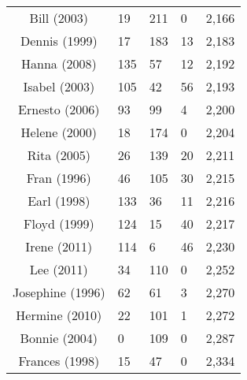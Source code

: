 \begin{table}[ht]
\begin{tabular}{cP{3cm}P{3cm}P{3cm}P{3cm}}
  Bill (2003) & 19 & 211 & 0 & 2,166 \\ 
  Dennis (1999) & 17 & 183 & 13 & 2,183 \\ 
  Hanna (2008) & 135 & 57 & 12 & 2,192 \\ 
  Isabel (2003) & 105 & 42 & 56 & 2,193 \\ 
  Ernesto (2006) & 93 & 99 & 4 & 2,200 \\ 
  Helene (2000) & 18 & 174 & 0 & 2,204 \\ 
  Rita (2005) & 26 & 139 & 20 & 2,211 \\ 
  Fran (1996) & 46 & 105 & 30 & 2,215 \\ 
  Earl (1998) & 133 & 36 & 11 & 2,216 \\ 
  Floyd (1999) & 124 & 15 & 40 & 2,217 \\ 
  Irene (2011) & 114 & 6 & 46 & 2,230 \\ 
  Lee (2011) & 34 & 110 & 0 & 2,252 \\ 
  Josephine (1996) & 62 & 61 & 3 & 2,270 \\ 
  Hermine (2010) & 22 & 101 & 1 & 2,272 \\ 
  Bonnie (2004) & 0 & 109 & 0 & 2,287 \\ 
  Frances (1998) & 15 & 47 & 0 & 2,334 \\ 
   \bottomrule
\end{tabular}
\end{table}
